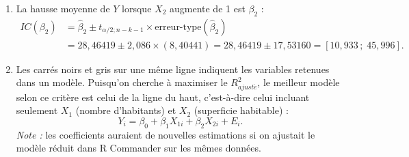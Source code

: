 \begin{exercice}
\begin{solution}
\begin{enumerate}[label=(\alph*)]
  \[
    H_0:\beta_1=\beta_2=\beta_3=\beta_4=0
    \quad\text{à}\quad
    H_1:\text{au moins un }\beta_j\neq 0\text{ pour }j=1,2,3,4.
  \]
  Puisque $\alpha^*=4,77\times 10^{-10}<0,05$, on rejette $H_0$. Ainsi, au moins une des 4
  variables est liée linéairement à la consommation d'électricité.
  \item La hausse moyenne de $Y$ lorsque $X_2$ augmente de 1 est $\beta_2$ :
  \begin{align*}
    IC(\beta_2)&=\hat\beta_2\pm t_{\alpha/2;n-k-1}\times\text{erreur-type}(\hat\beta_2)\\
    &=28,46419\pm 2,086\times(8,40441)
    =28,46419\pm 17,53160
    =[10,933\,;\;45,996].
  \end{align*}
  \item Les carrés noirs et gris sur une même ligne indiquent les variables retenues dans un
  modèle. Puisqu'on cherche à maximiser le $R^2_{ajust\acute e}$, le meilleur modèle selon
  ce critère est celui de la ligne du haut, c'est-à-dire celui incluant seulement
  $X_1$ (nombre d'habitants) et $X_2$ (superficie habitable) :
  \[
    Y_i=\beta_0+\beta_1X_{1i}+\beta_2X_{2i}+E_i.
  \]
  \emph{Note :} les coefficients auraient de nouvelles estimations si on ajustait le modèle
  réduit dans R Commander sur les mêmes données.
\end{enumerate}
\end{solution}
\end{exercice}

